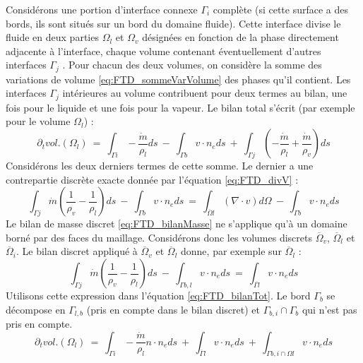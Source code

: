Consid\'erons une portion d'interface connexe $\Gamma_{i}$ compl\`ete (si cette surface a des bords, ils sont situ\'es sur un bord du domaine fluide). Cette interface divise le fluide en deux parties $\Omega_{l}$ et $\Omega_{v}$
d\'esign\'ees en fonction de la phase directement adjacente \`a l'interface, chaque volume contenant \'eventuellement d'autres interfaces $\Gamma_{j}$ . Pour chacun des deux volumes, on consid\`ere la somme des variations de volume \ref{eq:FTD_sommeVarVolume} des phases qu'il contient. Les interfaces $\Gamma_{j}$ int\'erieures au volume contribuent pour deux termes au bilan, une fois pour le liquide et une fois pour la vapeur. Le bilan total s'\'ecrit (par exemple pour le volume $\Omega_{l}$) :
\begin{equation}
\partial_{t}vol.(\Omega_{l})\:=\:\int_{\Gamma i} - \dfrac{\dot{m}}{\rho_{l}} ds \:-\:\int_{\Gamma b} v \cdot n_{e}ds\:+\:\int_{\Gamma j} \left( -\dfrac{\dot{m}}{\rho_{l}}+\dfrac{\dot{m}}{\rho_{v}} \right) ds \label{eq:FTD_bilanTot}
\end{equation}
Consid\'erons les deux derniers termes de cette somme. Le dernier a une contrepartie discrète exacte donn\'ee par l'\'equation \ref{eq:FTD_divV} :
\begin{equation}
\int_{\Gamma j} \dot{m} \left( \dfrac{1}{\rho_{v}}-\dfrac{1}{\rho_{l}} \right) ds\:-\:\int_{\Gamma b} v \cdot n_{e}ds\:=\:\int_{\overline{\Omega}l} (\nabla \cdot v)d\Omega\:-\:\int_{\Gamma b} v \cdot n_{e}ds
\end{equation}
Le bilan de masse discret \ref{eq:FTD_bilanMasse} ne s'applique qu'\`a un domaine born\'e par des faces du maillage. Consid\'erons donc les volumes discrets $\overline{\Omega}_{v}$, $\overline{\Omega}_{l}$ et $\overline{\Omega}_{i}$. Le bilan discret appliqu\'e \`a $\overline{\Omega}_{v}$ et $\overline{\Omega}_{l}$ donne, par exemple sur $\overline{\Omega}_{l}$ :
\begin{equation}
\int_{\Gamma j} \dot{m} \left( \dfrac{1}{\rho_{v}}-\dfrac{1}{\rho_{l}} \right) ds\:-\:\int_{\Gamma b,l} v \cdot n_{e}ds\:=\:\int_{\overline{\Gamma l}} v \cdot n_{e}ds
\end{equation}
Utilisons cette expression dans l'\'equation \ref{eq:FTD_bilanTot}. Le bord $\Gamma_{b}$ se d\'ecompose en $\Gamma_{l,b}$ (pris en compte dans le bilan discret) et $\Gamma_{b,i} \cap \Gamma_{b}$ qui n'est pas pris en compte.
\begin{equation}
\partial_{t}vol.(\Omega_{l})\:=\:\int_{\Gamma i}-\dfrac{\dot{m}}{\rho_{l}}n\cdot n_{e}ds\:+\:\int_{\overline{\Gamma}l}v \cdot n_{e} ds\:+\:\int_{\Gamma b,i \cap \Omega l} v \cdot n_{e} ds
\end{equation}
